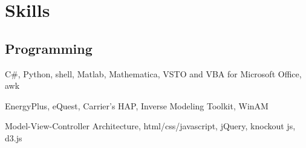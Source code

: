 \documentclass[]{deedy-resume-openfont}
\begin{document}
\begin{minipage}[t]{0.33\textwidth}




\section{Skills}
\subsection{Programming}

C\#, Python, shell, Matlab, Mathematica, VSTO and VBA for Microsoft
Office, awk
\sectionsep

EnergyPlus, eQuest, Carrier's HAP, Inverse Modeling Toolkit, WinAM
\sectionsep

Model-View-Controller Architecture, html/css/javascript, jQuery,
knockout js, d3.js
\sectionsep


\end{minipage}
\end{document}
